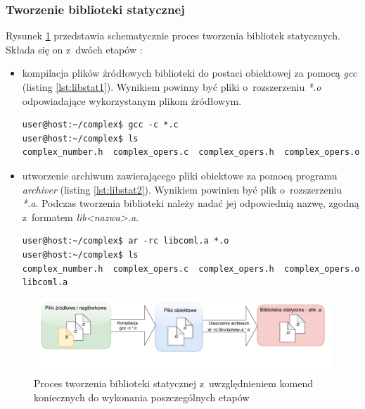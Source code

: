 \subsubsection*{Tworzenie biblioteki statycznej}
Rysunek \ref{fig:staticlibflow} przedstawia schematycznie proces tworzenia bibliotek statycznych. Składa się on z~dwóch etapów \cite{Static1}:
\begin{itemize}
\item kompilacja plików źródłowych biblioteki do postaci obiektowej za pomocą \textit{gcc} (listing \ref{lst:libstat1}). Wynikiem powinny być pliki o~rozszerzeniu \textit{*.o} odpowiadające wykorzystanym plikom źródłowym.

\begin{lstlisting}[language=Cmd, caption={Kompilacja plików źródłowych biblioteki do postaci obiektowej - polecenie oraz jego wynik},label={lst:libstat1}]
user@host:~/complex$ gcc -c *.c
user@host:~/complex$ ls
complex_number.h  complex_opers.c  complex_opers.h  complex_opers.o
\end{lstlisting}


\item utworzenie archiwum zawierającego pliki obiektowe za pomocą programu \textit{archiver} (listing \ref{lst:libstat2}). Wynikiem powinien być plik o~rozszerzeniu \textit{*.a}. Podczas tworzenia biblioteki należy nadać jej odpowiednią nazwę, zgodną z~formatem \textit{lib<nazwa>.a}.

\begin{lstlisting}[language=Cmd, caption={Utworzenie biblioteki statycznej z~plików obiektowych - polecenie oraz jego wynik},label={lst:libstat2}]
user@host:~/complex$ ar -rc libcoml.a *.o
user@host:~/complex$ ls
complex_number.h  complex_opers.c  complex_opers.h  complex_opers.o  libcoml.a
\end{lstlisting}

\end{itemize}

\begin{figure}[H]
\centering
\includegraphics[width=\textwidth]{res/StaticLibFlow}
\caption{Proces tworzenia biblioteki statycznej z~uwzględnieniem komend koniecznych do wykonania poszczególnych etapów \cite{Compiling}}
\label{fig:staticlibflow}
\end{figure}


